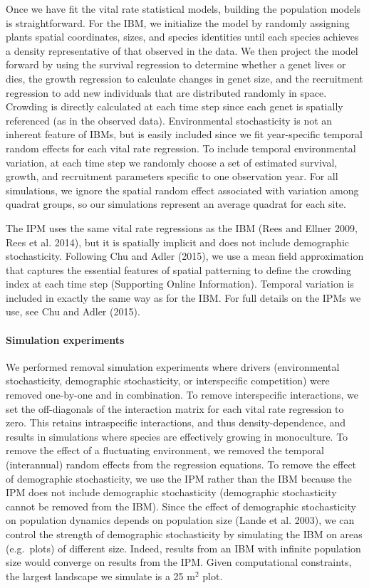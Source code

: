 \documentclass[12pt,]{article}
\begin{document}
Once we have fit the vital rate statistical models, building the
population models is straightforward. For the IBM, we initialize the
model by randomly assigning plants spatial coordinates, sizes, and
species identities until each species achieves a density representative
of that observed in the data. We then project the model forward by using
the survival regression to determine whether a genet lives or dies, the
growth regression to calculate changes in genet size, and the
recruitment regression to add new individuals that are distributed
randomly in space. Crowding is directly calculated at each time step
since each genet is spatially referenced (as in the observed data).
Environmental stochasticity is not an inherent feature of IBMs, but is
easily included since we fit year-specific temporal random effects for
each vital rate regression. To include temporal environmental variation,
at each time step we randomly choose a set of estimated survival,
growth, and recruitment parameters specific to one observation year. For
all simulations, we ignore the spatial random effect associated with
variation among quadrat groups, so our simulations represent an average
quadrat for each site.

The IPM uses the same vital rate regressions as the IBM (Rees and Ellner
2009, Rees et al. 2014), but it is spatially implicit and does not
include demographic stochasticity. Following Chu and Adler (2015), we
use a mean field approximation that captures the essential features of
spatial patterning to define the crowding index at each time step
(Supporting Online Information). Temporal variation is included in
exactly the same way as for the IBM. For full details on the IPMs we
use, see Chu and Adler (2015).

\paragraph{Simulation experiments}\label{simulation-experiments}

We performed removal simulation experiments where drivers (environmental
stochasticity, demographic stochasticity, or interspecific competition)
were removed one-by-one and in combination. To remove interspecific
interactions, we set the off-diagonals of the interaction matrix for
each vital rate regression to zero. This retains intraspecific
interactions, and thus density-dependence, and results in simulations
where species are effectively growing in monoculture. To remove the
effect of a fluctuating environment, we removed the temporal
(interannual) random effects from the regression equations. To remove
the effect of demographic stochasticity, we use the IPM rather than the
IBM because the IPM does not include demographic stochasticity
(demographic stochasticity cannot be removed from the IBM). Since the
effect of demographic stochasticity on population dynamics depends on
population size (Lande et al. 2003), we can control the strength of
demographic stochasticity by simulating the IBM on areas (e.g.~plots) of
different size. Indeed, results from an IBM with infinite population
size would converge on results from the IPM. Given computational
constraints, the largest landscape we simulate is a 25 \(\text{m}^2\)
plot.
\end{document}
